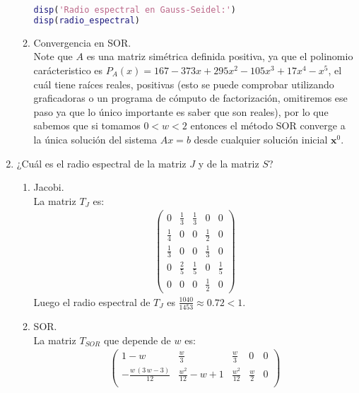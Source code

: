 \begin{homeworkProblem}
\begin{enumerate}
\begin{solucion}
\begin{enumerate}
\begin{lstlisting}[language = matlab]
% Mostrar resultado
disp('Radio espectral en Gauss-Seidel:')
disp(radio_espectral)
            \end{lstlisting}
          \item Convergencia en SOR.\\
            Note que $A$ es una matriz simétrica definida positiva, ya que el polinomio carácteristico es $P_A(x)=167 - 373 x + 295 x^2 - 105 x^3 + 17 x^4 - x^5$, el cuál tiene raíces reales, positivas (esto se puede comprobar utilizando graficadoras o un programa de cómputo de factorización, omitiremos ese paso ya que lo único importante es saber que son reales), por lo que sabemos que si tomamos $0<w<2$ entonces el método SOR converge a la única solución del sistema $Ax=b$ desde cualquier solución inicial $\textbf{x}^{0}$. 
        \end{enumerate}
      \end{solucion}
      \newpage
    \item ¿Cuál es el radio espectral de la matriz $J$ y de la matriz $S$?
      \begin{solucion}
        \begin{enumerate}
          \item Jacobi.\\
          La matriz $T_J$ es:
          \begin{align*}
            \begin{pmatrix}
              0           & \frac{1}{3} & \frac{1}{3} & 0           & 0\\
              \frac{1}{4} & 0           & 0           & \frac{1}{2} & 0\\
              \frac{1}{3} & 0           & 0           & \frac{1}{3} & 0\\
              0           & \frac{2}{5} & \frac{1}{5} & 0           & \frac{1}{5}\\
              0           & 0           & 0           & \frac{1}{2} & 0 
            \end{pmatrix}
          \end{align*}
          Luego el radio espectral de $T_J$ es $\frac{1040}{1453}\approx 0.72 < 1$.
          \item SOR.\\
          La matriz $T_{SOR}$ que depende de $w$ es:
          \begin{align*}
            \begin{pmatrix}
              1-w & \frac{w}{3} & \frac{w}{3} & 0 & 0\\
              -\frac{w\,\left(3\,w-3\right)}{12} & \frac{w^2}{12}-w+1 & \frac{w^2}{12} & \frac{w}{2} & 0\\

\end{pmatrix}
\end{align*}
\end{enumerate}
\end{solucion}
\end{enumerate}
\end{homeworkProblem}
